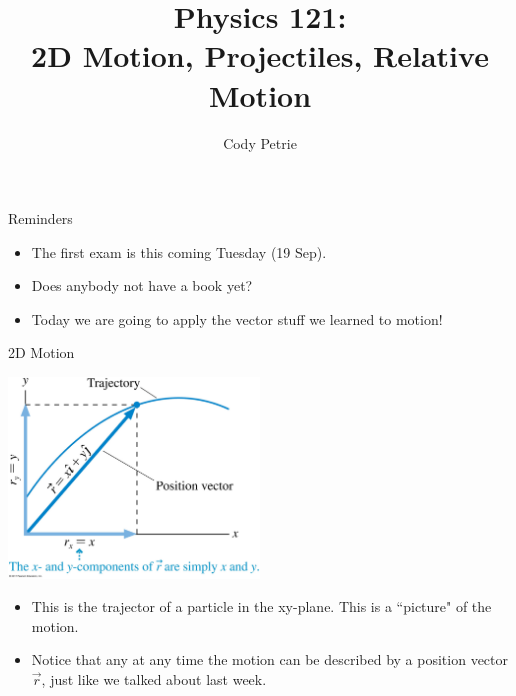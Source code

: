 \documentclass{beamer}
\title[{\color{white}{Chapters 4.1-3}}]{Physics 121: \\ 2D Motion, Projectiles, Relative Motion}
\author{Cody Petrie}
\institute{Mesa Community College}
\date{}
\begin{document}
\begin{frame}
\titlepage
\end{frame}



\begin{frame}{Reminders}
\begin{itemize}
   \item The first exam is this coming Tuesday (19 Sep).
   \item Does anybody not have a book yet?
   \item Today we are going to apply the vector stuff we learned to motion!
\end{itemize}
\end{frame}

\begin{frame}{2D Motion}
\begin{center}
   \includegraphics[width=0.5\textwidth]{../figures/04_01_Figure.jpg}
\end{center}
\begin{itemize}
   \item This is the trajector of a particle in the xy-plane. This is a ``picture" of the motion.
   \item Notice that any at any time the motion can be described by a position vector $\vec{r}$, just like we talked about last week.
\end{itemize}
\end{frame}
\end{document}
